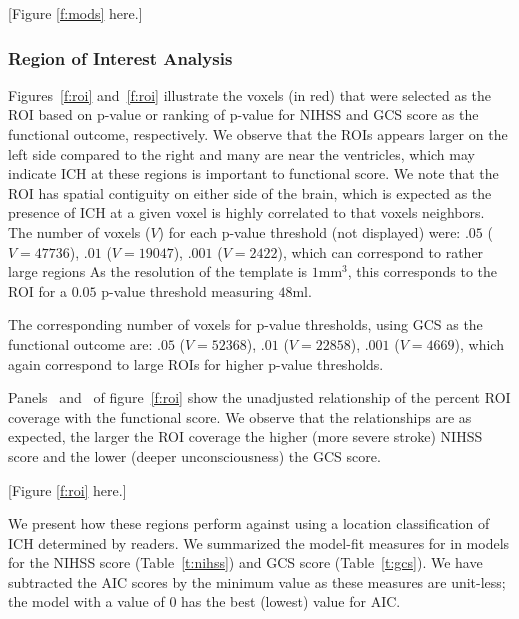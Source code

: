 \documentclass[10pt]{article}\usepackage[]{graphicx}\usepackage[]{color}
\begin{document}
[Figure \ref{f:mods} here.]

\subsubsection*{Region of Interest Analysis}




Figures~\ref{f:roi}\protect{} and~\ref{f:roi}\protect{} illustrate the voxels (in red) that were selected as the ROI based on p-value or ranking of p-value for NIHSS and GCS score as the functional outcome, respectively.  We observe that the ROIs appears larger on the left side compared to the right and many are near the ventricles, which may indicate ICH at these regions is important to functional score.  We note that the ROI has spatial contiguity on either side of the brain, which is expected as the presence of ICH at a given voxel is highly correlated to that voxels neighbors.  
The number of voxels ($V$) for each p-value threshold (not displayed) were: $.05$ ($V = 47736$), $.01$ ($V = 19047$), $.001$ ($V = 2422$), which can correspond to rather large regions  As the resolution of the template is $1$mm$^3$, this corresponds to the ROI for a $0.05$ p-value threshold measuring $48$ml. 



The corresponding number of voxels for p-value thresholds, using GCS as the functional outcome are:  $.05$ ($V = 52368$), $.01$ ($V = 22858$), $.001$ ($V = 4669$), which again correspond to large ROIs for higher p-value thresholds.

Panels~\protect{} and~\protect{} of figure~\ref{f:roi} show the unadjusted relationship of the percent ROI coverage with the functional score.  We observe that the relationships are as expected, the larger the ROI coverage the higher (more severe stroke) NIHSS score and the lower (deeper unconsciousness) the GCS score.

[Figure \ref{f:roi} here.]











We present how these regions perform against using a location classification of ICH determined by readers.  We summarized the model-fit measures for in models for the NIHSS score (Table~\ref{t:nihss}) and GCS score (Table~\ref{t:gcs}).  We have subtracted the AIC scores by the minimum value as these measures are unit-less; the model with a value of $0$ has the best (lowest) value for AIC.  
\end{document}
